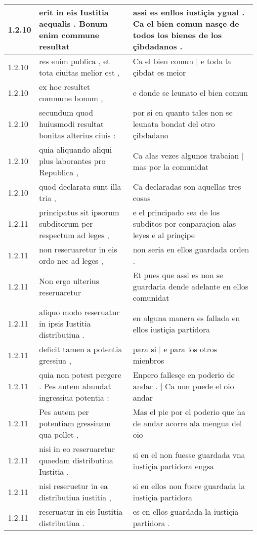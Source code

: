 \begin{tabular}{|p{1cm}|p{6.5cm}|p{6.5cm}|}
1.2.10 & erit in eis Iustitia aequalis . Bonum enim commune resultat & assi es enllos iustiçia ygual . Ca el bien comun nasçe de todos los bienes de los çibdadanos . \\\hline
1.2.10 & res enim publica , et tota ciuitas melior est , & Ca el bien comun | e toda la çibdat es meior \\\hline
1.2.10 & ex hoc resultet commune bonum , & e donde se leunato el bien comun \\\hline
1.2.10 & secundum quod huiusmodi resultat bonitas alterius ciuis : & por si en quanto tales non se leunata bondat del otro çibdadano \\\hline
1.2.10 & quia aliquando aliqui plus laborantes pro Republica , & Ca alas vezes algunos trabaian | mas por la comunidat \\\hline
1.2.10 & quod declarata sunt illa tria , & Ca declaradas son aquellas tres cosas \\\hline
1.2.11 & principatus sit ipsorum subditorum per respectum ad leges , & e el principado sea de los subditos por conparaçion alas leyes e al prinçipe \\\hline
1.2.11 & non reseruaretur in eis ordo nec ad leges , & non seria en ellos guardada orden . \\\hline
1.2.11 & Non ergo ulterius reseruaretur & Et pues que assi es non se guardaria dende adelante en ellos comunidat \\\hline
1.2.11 & aliquo modo reseruatur in ipsis Iustitia distributiua . & en alguna manera es fallada en ellos iustiçia partidora \\\hline
1.2.11 & deficit tamen a potentia gressiua , & para si | e para los otros mienbros \\\hline
1.2.11 & quia non potest pergere . Pes autem abundat ingressiua potentia : & Enpero fallesçe en poderio de andar . | Ca non puede el oio andar \\\hline
1.2.11 & Pes autem per potentiam gressiuam qua pollet , & Mas el pie por el poderio que ha de andar acorre ala mengua del oio \\\hline
1.2.11 & nisi in eo reseruaretur quaedam distributiua Iustitia , & si en el non fuesse guardada vna iustiçia partidora engsa \\\hline
1.2.11 & nisi reseruetur in ea distributiua iustitia , & si en ellos non fuere guardada la iustiçia partidora \\\hline
1.2.11 & reseruatur in eis Iustitia distributiua . & es en ellos guardada la iustiçia partidora . \\\hline

\end{tabular}
